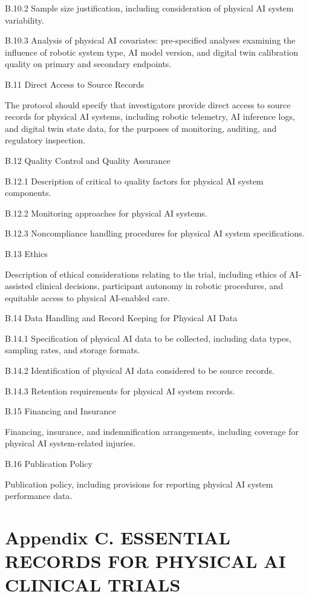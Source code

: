 \documentclass[11pt]{article}
\begin{document}
B.10.2 Sample size justification, including consideration of physical AI system variability.

B.10.3 Analysis of physical AI covariates: pre-specified analyses examining the influence of robotic system type, AI model version, and digital twin calibration quality on primary and secondary endpoints.

B.11 Direct Access to Source Records

The protocol should specify that investigators provide direct access to source records for physical AI systems, including robotic telemetry, AI inference logs, and digital twin state data, for the purposes of monitoring, auditing, and regulatory inspection.

B.12 Quality Control and Quality Assurance

B.12.1 Description of critical to quality factors for physical AI system components.

B.12.2 Monitoring approaches for physical AI systems.

B.12.3 Noncompliance handling procedures for physical AI system specifications.

B.13 Ethics

Description of ethical considerations relating to the trial, including ethics of AI-assisted clinical decisions, participant autonomy in robotic procedures, and equitable access to physical AI-enabled care.

B.14 Data Handling and Record Keeping for Physical AI Data

B.14.1 Specification of physical AI data to be collected, including data types, sampling rates, and storage formats.

B.14.2 Identification of physical AI data considered to be source records.

B.14.3 Retention requirements for physical AI system records.

B.15 Financing and Insurance

Financing, insurance, and indemnification arrangements, including coverage for physical AI system-related injuries.

B.16 Publication Policy

Publication policy, including provisions for reporting physical AI system performance data.

\section{Appendix C. ESSENTIAL RECORDS FOR PHYSICAL AI CLINICAL TRIALS}
\end{document}
